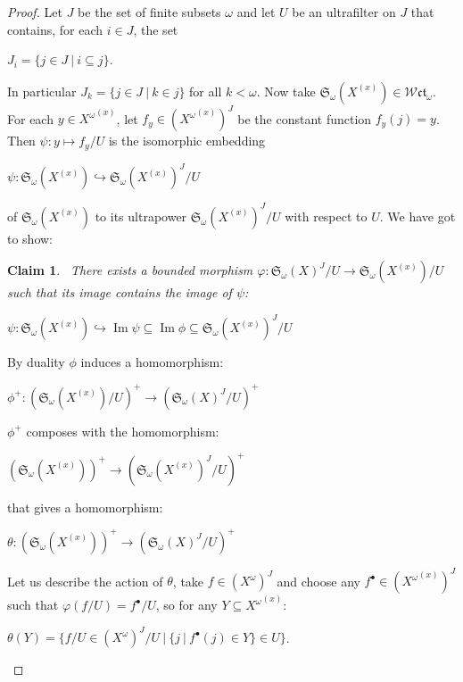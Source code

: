 \documentclass{article}
\theoremstyle{defin}
\theoremstyle{theorem}
\theoremstyle{claim}
\newtheorem{claim}{Claim}
\theoremstyle{prop}
\theoremstyle{lemma}
\theoremstyle{fact}
\theoremstyle{remark}
\theoremstyle{ex}
\theoremstyle{col}
\theoremstyle{question}
\begin{document}
\begin{proof}
Let $J$ be the set of finite subsets $\omega$ and let $U$ be an ultrafilter on $J$ that contains, 
for each $i \in J$, the set
\begin{center}
$J_i = \{ j \in J \: | \: i \subseteq j \}$.
\end{center}
In particular $J_k = \{ j \in J \: | \: k \in j \}$ for all $k < \omega$. 
Now take $\mathfrak{S}_{\omega}(X^{(x)}) \in \mathcal{W}\mathfrak{ct}_{\omega}$.
For each $y \in {X^{\omega}}^{(x)}$, let $f_y \in {({X^{\omega}}^{(x)})}^{J}$ be the constant 
function $f_y(j) = y$. Then $\psi : y \mapsto f_y / U$ is the isomorphic embedding
\begin{center}
$\psi : \mathfrak{S}_{\omega}(X^{(x)}) \hookrightarrow \mathfrak{S}_{\omega}{(X^{(x)})}^J/U$
\end{center}
of $\mathfrak{S}_{\omega}(X^{(x)})$ to its ultrapower $\mathfrak{S}_{\omega}{(X^{(x)})}^J/U$ with respect to $U$. We have got to show:
\begin{claim}~\label{claim}
There exists a bounded morphism $\varphi : \mathfrak{S}_{\omega}{(X)}^J/U \to \mathfrak{S}_{\omega}(X^{(x)})/U$ 
such that its image contains the image of $\psi$:
\begin{center}
$\psi : \mathfrak{S}_{\omega}(X^{(x)}) \hookrightarrow \operatorname{Im}\psi \subseteq \operatorname{Im}\phi \subseteq \mathfrak{S}_{\omega}{(X^{(x)})}^J / U $
\end{center}
\end{claim}

By duality $\phi$ induces a homomorphism:
\begin{center}
$\phi^+ : {(\mathfrak{S}_{\omega}(X^{(x)})/U)}^+ \to {(\mathfrak{S}_{\omega}{(X)}^J/U)}^+$
\end{center}
$\phi^+$ composes with the homomorphism:
\begin{center}
${(\mathfrak{S}_{\omega}(X^{(x)}))}^+ \to {(\mathfrak{S}_{\omega}{(X^{(x)})}^J/U)}^+$
\end{center}
that gives a homomorphism:
\begin{center}
$\theta : {(\mathfrak{S}_{\omega}(X^{(x)}))}^+ \to {(\mathfrak{S}_{\omega}{(X)}^J/U)}^+$
\end{center}
Let us describe the action of $\theta$, take $f \in {(X^{\omega})}^J$ and choose any 
$f^{\bullet} \in {({X^{\omega}}^{(x)})}^J$ such that $\varphi(f/U) = f^{\bullet}/U$, 
so for any $Y \subseteq {X^{\omega}}^{(x)}$:
\begin{center}
$\theta(Y) = \{ f/U \in {(X^{\omega})}^J/U \: | \: \{ j \: | \: f^{\bullet}(j) \in Y \} \in U \}$.
\end{center}


\end{proof}
\end{document}
